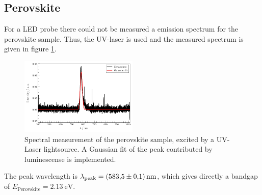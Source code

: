 \subsection{Perovskite}
\label{sec:perovsikite-measure}

For a LED probe there could not be measured a emission spectrum for the perovskite sample. Thus, the UV-laser is used and the measured spectrum is given in figure \ref{fig:perov}.
\begin{figure}
    \captionsetup{width=0.9\linewidth}
    \includegraphics[width=0.5\textwidth]{plots/Samp_P_UV.pdf}
  \caption{Spectral measurement of the perovskite sample, excited by a UV-Laser lightsource. A Gaussian fit of the peak contributed by luminescense is implemented.}
    \label{fig:perov}
\end{figure}
The peak wavelength is $\lambda_\text{peak}= \SI{583.5 \pm 0.1}{\nano\meter}$, which gives directly a bandgap of 
$E_\text{Perovskite} = \SI{2.13}{\eV}$.

